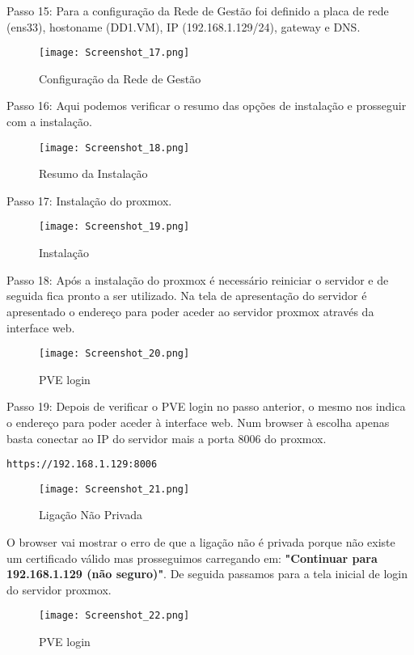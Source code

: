 \newpage
Passo 15: Para a configuração da Rede de Gestão foi definido a placa de rede (ens33), hostoname (DD1.VM), \ac{IP} (192.168.1.129/24), gateway e \ac{DNS}.
\begin{figure}[H]
\center
\texttt{[image: Screenshot\_17.png]}
\caption{Configuração da Rede de Gestão}
\end{figure}

Passo 16: Aqui podemos verificar o resumo das opções de instalação e prosseguir com a instalação.
\begin{figure}[H]
\center
\texttt{[image: Screenshot\_18.png]}
\caption{Resumo da Instalação}
\end{figure}

\newpage
Passo 17: Instalação do proxmox.
\begin{figure}[H]
\center
\texttt{[image: Screenshot\_19.png]}
\caption{Instalação}
\end{figure}

Passo 18: Após a instalação do proxmox é necessário reiniciar o servidor e de seguida fica pronto a ser utilizado. Na tela de apresentação do servidor é apresentado o endereço para poder aceder ao servidor proxmox através da interface web.
\begin{figure}[H]
\center
\texttt{[image: Screenshot\_20.png]}
\caption{\ac{PVE} login}
\end{figure}

\newpage
Passo 19: Depois de verificar o \ac{PVE} login no passo anterior, o mesmo nos indica o endereço para poder aceder à interface web. Num browser à escolha apenas basta conectar ao \ac{IP} do servidor mais a porta 8006 do proxmox. 
\begin{verbatim}https://192.168.1.129:8006\end{verbatim}
\begin{figure}[H]
\center
\texttt{[image: Screenshot\_21.png]}
\caption{Ligação Não Privada}
\end{figure}

O browser vai mostrar o erro de que a ligação não é privada porque não existe um certificado válido mas prosseguimos carregando em: \textbf{"Continuar para 192.168.1.129 (não seguro)"}. De seguida passamos para a tela inicial de login do servidor proxmox.

\begin{figure}[H]
\center
\texttt{[image: Screenshot\_22.png]}
\caption{\ac{PVE} login}
\end{figure}

